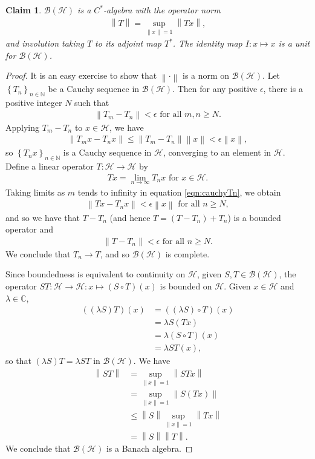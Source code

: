\documentclass[11pt,a4paper]{report}
\theoremstyle{plain}
\newtheorem*{claim}{Claim}
\theoremstyle{definition}
\newcommand{\1}{\mathbbm{1}}
\newcommand{\C}{\mathbb{C}}
\newcommand{\N}{\mathbb{N}}
\renewcommand{\H}{\mathcal{H}}
\newcommand{\B}{\mathcal{B}}
\newcommand{\BH}{\mathcal{\B(\H)}}
\begin{document}
\begin{claim} 
	$\B(\H)$ is a $C^\ast$-algebra with the operator norm 
	\begin{align*}
		\left\|T\right\|= \sup_{\left\|x\right\|=1}{\left\|Tx\right\|},
	\end{align*}
	and involution taking $T$ to its adjoint map $T^\ast$. 
	The identity map $I:x\mapsto x$ is a unit for $\BH$.
\end{claim}
\begin{proof}
	It is an easy exercise to show that $\left\|\cdot\right\|$ is a norm on $\BH$. 
	Let $\left\{T_n\right\}_{n\in\N}$ be a Cauchy sequence in $\BH$. Then for any 
	positive $\epsilon$, there is a positive integer $N$ such that 
	\begin{align*}
		\left\|T_m-T_n\right\| < \epsilon \mbox{ for all } m,n \geq N.
	\end{align*}
	Applying $T_m-T_n$ to $x \in \H$, we have 
	\begin{align}\label{eqn:cauchyTn}
		\left\|T_mx-T_nx\right\| 	\leq \left\|T_m-T_n\right\| \left\|x\right\| 
									< \epsilon \left\|x\right\|,
	\end{align}
	so $\left\{T_n x\right\}_{n\in\N}$ is a Cauchy sequence in $\H$, converging to 
	an element in $\H$. Define a linear operator $T:\H \to \H$ by 
	\begin{align*}
		Tx= \lim_{n\to\infty}{T_nx} \mbox{ for } x \in \H.
	\end{align*}
	Taking limits as $m$ tends to infinity in equation \eqref{eqn:cauchyTn}, we obtain
	\begin{align*}
		\left\|Tx-T_nx\right\| < \epsilon \left\|x\right\| \mbox{ for all }n \geq N,
	\end{align*}
	and so we have that $T-T_n$ (and hence $T=(T-T_n)+T_n$) is a bounded operator and  
	\begin{align*}
		\left\|T-T_n\right\| <\epsilon \mbox{ for all }n \geq N.
	\end{align*}
	We conclude that $T_n \to T$, and so $\BH$ is complete.
	
	Since boundedness is equivalent to continuity on $\H$, given $S,T\in\BH$, the 
	operator $ST:\H \to \H: x \mapsto (S\circ T)(x)$ is bounded on $\H$. Given 
	$x\in\H$ and $\lambda\in\C$, 
	\begin{align*}
			((\lambda S)T)(x)
		&=	((\lambda S)\circ T)(x)															\\
		&=	\lambda S(Tx)																	\\
		&=	\lambda (S\circ T)(x)															\\
		&=	\lambda ST(x),		
	\end{align*} 
	so that $(\lambda S)T = \lambda ST$ in $\BH$. We have 
	\begin{align*}
				\left\|ST\right\|
		&=		\sup_{\left\|x\right\|=1}{\left\|STx\right\|} 								\\
		&=		\sup_{\left\|x\right\|=1}{\left\|S(Tx)\right\|} 							\\
		&\leq	\left\|S\right\| \sup_{\left\|x\right\|=1}{\left\|Tx\right\|} 				\\
		&=		\left\|S\right\| \left\|T\right\|.
	\end{align*}
	We conclude that $\BH$ is a Banach algebra.
	

\end{proof}
\end{document}

